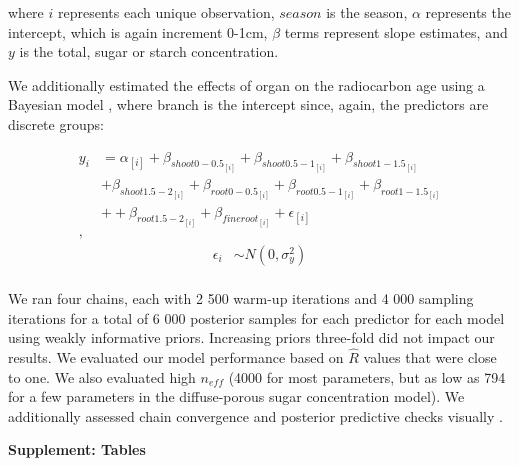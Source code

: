 \documentclass{article}\usepackage[]{graphicx}\usepackage[]{color}
\begin{document}
where $i$ represents each unique observation, $season$ is the season, $\alpha$ represents the intercept, which is again increment 0-1cm, $\beta$ terms represent slope estimates, and $y$ is the total, sugar or starch concentration. 

We additionally estimated the effects of organ on the radiocarbon age using a Bayesian model \citep{brms, R}, where branch is the intercept since, again, the predictors are discrete groups:

\begin{align*}
y_i &= \alpha_{[i]} + \beta_{shoot0-0.5_{[i]}} + \beta_{shoot0.5-1_{[i]}} + \beta_{shoot1-1.5_{[i]}}\\
&+ \beta_{shoot1.5-2_{[i]}} + \beta_{root0-0.5_{[i]}} + \beta_{root0.5-1_{[i]}} + \beta_{root1-1.5_{[i]}}\\
&+ + \beta_{root1.5-2_{[i]}} + \beta_{fineroot_{[i]}} +\epsilon_{[i]}\\,
\end{align*}
\begin{align*}
\epsilon_i & \sim N(0,\sigma^2_y) \\
\end{align*}

We ran four chains, each with 2 500 warm-up iterations and 4 000 sampling iterations for a total of 6 000 posterior samples for each predictor for each model using weakly informative priors. Increasing priors three-fold did not impact our results. We evaluated our model performance based on $\hat{R}$ values that were close to one. We also evaluated high $n_{eff}$ (4000 for most parameters, but as low as 794 for a few parameters in the diffuse-porous sugar concentration model). We additionally assessed chain convergence and posterior predictive checks visually \citep{BDA}. 



\textbf{\LARGE{Supplement: Tables}} 
\end{document}
